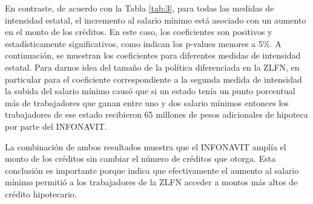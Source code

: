 \begin{table}[H]
\begin{adjustbox}{max width=\textwidth}
\begin{tabular}{lcccc}
\end{tabular}
\end{adjustbox}

\end{table}


En contraste, de acuerdo con la Tabla \ref{tab:3}, para todas las medidas de intensidad estatal, el incremento al salario mínimo está asociado con un aumento en el monto de los créditos. En este caso, los coeficientes  son positivos  y estadísticamente significativos, como indican los p-values menores a 5\%. A continuación, se muestran los coeficientes  para diferentes medidas de intensidad estatal. Para darnos idea del tamaño de la política diferenciada en la ZLFN, en particular para el coeficiente correspondiente a la segunda medida de intensidad la subida del salario mínimo causó que si un estado tenía un punto porcentual más de trabajadores que ganan entre uno y dos salario mínimos entonces los trabajadores de ese estado recibieron 65 millones de pesos adicionales de hipoteca por parte del INFONAVIT.

La combinación de ambos resultados muestra que el INFONAVIT amplía el monto de los créditos sin cambiar el número de créditos que otorga. Esta conclusión es importante porque indica que efectivamente el aumento al salario mínimo permitió a los trabajadores de la ZLFN acceder a montos más altos de crédito hipotecario.



